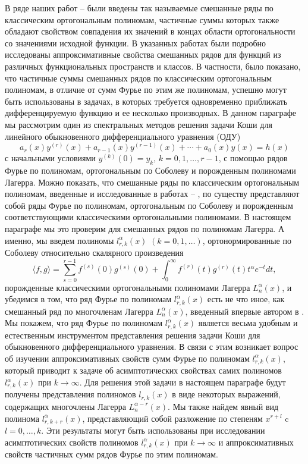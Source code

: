 В ряде наших работ  \cite{Haar-Tcheb-Shar11} -- \cite{Haar-Tcheb-Shar16} были введены так называемые смешанные ряды по классическим ортогональным полиномам, частичные суммы которых также обладают свойством совпадения их значений в концах области ортогональности  со значениями исходной функции.  В указанных работах были подробно исследованы аппроксимативные свойства смешанных рядов для функций из различных функциональных пространств и классов. В частности, было показано, что частичные суммы смешанных рядов по классическим ортогональным полиномам, в отличие от сумм Фурье по этим же полиномам, успешно могут быть использованы в задачах, в которых требуется одновременно приближать дифференцируемую функцию и ее несколько производных.
В данном параграфе мы рассмотрим один из спектральных методов решения задачи Коши для линейного обыкновенного дифференциального уравнения (ОДУ)
\begin{equation}\label{sob-lag-smj-1.1}
 a_r(x)y^{(r)}(x)+a_{r-1}(x)y^{(r-1)}(x)+\cdots+a_0(x)y(x)=h(x)
 \end{equation}
с начальными условиями $y^{(k)}(0)=y_k$, $k=0,1,\ldots,r-1$, с помощью рядов Фурье по полиномам, ортогональным по Соболеву и порожденным полиномами Лагерра. Можно показать, что смешанные ряды по классическим ортогональным полиномам, введенные и исследованные в  работах \cite{Haar-Tcheb-Shar11} -- \cite{Haar-Tcheb-Shar16}, по существу представляют собой ряды Фурье по  полиномам, ортогональным по Соболеву и порожденным соответствующими классическими ортогональными полиномами. В настоящем параграфе мы это проверим для смешанных рядов по полиномам Лагерра. А именно, мы  введем полиномы $l^\alpha_{r,k}(x)$ $(k=0,1,\ldots)$, ортонормированные  по Соболеву относительно скалярного произведения
\begin{equation}\label{sob-lag-smj-1.3}
\langle f,g \rangle=\sum_{s=0}^{r-1}f^{(s)}(0)g^{(s)}(0)+\int_0^\infty f^{(r)}(t)g^{(r)}(t)t^\alpha e^{-t}dt,
\end{equation}
порожденные классическими ортогональными полиномами Лагерра  $L_n^\alpha(x)$, и убедимся в  том, что ряд Фурье по полиномам  $l^\alpha_{r,k}(x)$ есть не что иное, как смешанный ряд по многочленам Лагерра $L_n^\alpha(x)$, введенный впервые автором в \cite{Haar-Tcheb-Shar13}.
Мы покажем, что ряд Фурье по полиномам  $l^\alpha_{r,k}(x)$ является весьма удобным и естественным  инструментом  представления решения задачи Коши для обыкновенного дифференциального уравнения. В связи с этим возникает вопрос об изучении аппроксимативных свойств сумм Фурье по полиномам $l^\alpha_{r,k}(x)$, который приводит к задаче об асимптотических свойствах самих полиномов $l^\alpha_{r,k}(x)$ при $k\to\infty$. Для решения этой задачи в настоящем параграфе будут получены представления полиномов $l_{r,k}(x)$
в виде некоторых выражений, содержащих   многочлены Лагерра $L_n^{\alpha-r}(x)$. Мы также найдем явный  вид полинома $l^\alpha_{r,k+r}(x)$, представляющий собой разложение по степеням $x^{r+l}$ c $l=0,\ldots,k$. Эти результаты  могут  быть использованы при исследовании асимптотических свойств полиномов $l^\alpha_{r,k}(x)$ при $k\to\infty$ и аппроксимативных свойств частичных сумм рядов Фурье по этим полиномам.



